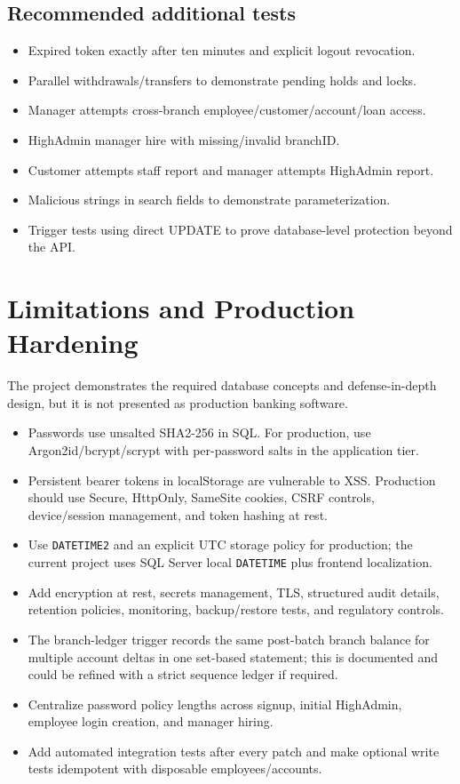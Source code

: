 \documentclass[11pt,a4paper,oneside]{report}
\begin{document}
\section{Recommended additional tests}
\begin{itemize}
\item Expired token exactly after ten minutes and explicit logout revocation.
\item Parallel withdrawals/transfers to demonstrate pending holds and locks.
\item Manager attempts cross-branch employee/customer/account/loan access.
\item HighAdmin manager hire with missing/invalid branchID.
\item Customer attempts staff report and manager attempts HighAdmin report.
\item Malicious strings in search fields to demonstrate parameterization.
\item Trigger tests using direct UPDATE to prove database-level protection beyond the API.
\end{itemize}

\chapter{Limitations and Production Hardening}
\begin{warningbox}
The project demonstrates the required database concepts and defense-in-depth design, but it is not presented as production banking software.
\end{warningbox}
\begin{itemize}
\item Passwords use unsalted SHA2-256 in SQL. For production, use Argon2id/bcrypt/scrypt with per-password salts in the application tier.
\item Persistent bearer tokens in localStorage are vulnerable to XSS. Production should use Secure, HttpOnly, SameSite cookies, CSRF controls, device/session management, and token hashing at rest.
\item Use \texttt{DATETIME2} and an explicit UTC storage policy for production; the current project uses SQL Server local \texttt{DATETIME} plus frontend localization.
\item Add encryption at rest, secrets management, TLS, structured audit details, retention policies, monitoring, backup/restore tests, and regulatory controls.
\item The branch-ledger trigger records the same post-batch branch balance for multiple account deltas in one set-based statement; this is documented and could be refined with a strict sequence ledger if required.
\item Centralize password policy lengths across signup, initial HighAdmin, employee login creation, and manager hiring.
\item Add automated integration tests after every patch and make optional write tests idempotent with disposable employees/accounts.
\end{itemize}
\end{document}
